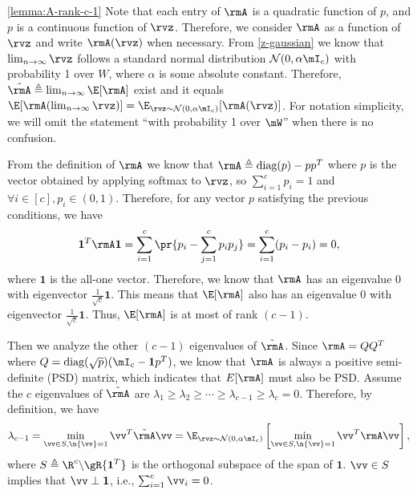 \begin{proofof}{\cref{lemma:A-rank-c-1}}
Note that each entry of $\rmA$ is a quadratic function of $p$, and $p$ is a continuous function of $\rvz$. Therefore, we consider $\rmA$ as a function of $\rvz$ and write $\rmA(\rvz)$ when necessary. From \cref{z-gaussian} we know that $\lim_{n\to\infty}\rvz$ follows a standard normal distribution $\mathcal{N}(0,\alpha \mI_c)$ with probability 1 over $W$, where $\alpha$ is some absolute constant. Therefore, $\tilde{\rmA}\triangleq\lim_{n\to\infty}\E[\rmA]$ exist and it equals $\E[\rmA(\lim_{n\to\infty} \rvz)]=\E_{\rvz\sim\mathcal{N}(0,\alpha \mI_c)}[\rmA(\rvz)]$. For notation simplicity, we will omit the statement ``with probability 1 over $\mW$'' when there is no confusion.

From the definition of $\rmA$ we know that $\rmA\triangleq \text{diag}(p)-pp^T$ where $p$ is the vector obtained by applying softmax to $\rvz$, so $\sum_{i=1}^c p_i=1$ and $\forall i\in[c], p_i\in(0,1)$. Therefore, for any vector $p$ satisfying the previous conditions, we have
\begin{equation}
\textbf{1}^T\rmA\textbf{1} = \sum_{i=1}^c\pr{p_i-\sum_{j=1}^cp_ip_j} = \sum_{i=1}^c(p_i-p_i) =0,
\end{equation}
where $\textbf{1}$ is the all-one vector. Therefore, we know that $\rmA$ has an eigenvalue 0 with eigenvector $\frac{1}{\sqrt{c}}\textbf{1}$. This means that $\E[\rmA]$ also has an eigenvalue 0 with eigenvector $\frac{1}{\sqrt{c}}\textbf{1}$. Thus, $\E[\rmA]$ is at most of rank $(c-1)$.

Then we analyze the other $(c-1)$ eigenvalues of $\tilde{\rmA}$. Since $\rmA=QQ^T$ where $Q=\text{diag}(\sqrt{p})(\mI_c-\textbf{1}p^T)$, we know that $\rmA$ is always a positive semi-definite (PSD) matrix, which indicates that $E[\rmA]$ must also be PSD. Assume the $c$ eigenvalues of $\tilde{\rmA}$ are $\lambda_1\geq\lambda_2\geq\cdots\geq\lambda_{c-1}\geq\lambda_c=0$. Therefore, by definition, we have
\begin{equation}
\lambda_{c-1} = \min_{\vv\in S, \n{\vv}=1}\vv^T\tilde{\rmA}\vv = \E_{\rvz\sim\mathcal{N}(0,\alpha \mI_c)}\left[\min_{\vv\in S, \n{\vv}=1}\vv^T\rmA\vv\right],
\end{equation}
where $S\triangleq\R^c\backslash\gR\{\textbf{1}^T\}$ is the orthogonal subspace of the span of $\textbf{1}$. $\vv\in S$ implies that $\vv\perp\textbf{1}$, i.e., $\sum_{i=1}^c \vv_i = 0$.


\end{proofof}
